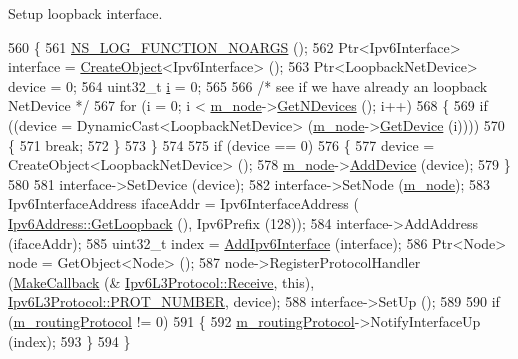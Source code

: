 Setup loopback interface. 


\begin{DoxyCode}
560 \{
561   \hyperlink{log-macros-disabled_8h_a8f7e4afc291c9d29a65c18ac1f79197b}{NS\_LOG\_FUNCTION\_NOARGS} ();
562   Ptr<Ipv6Interface> \textcolor{keyword}{interface }= \hyperlink{group__object_gad1d36559be10afa72c3656fd8598c1e2}{CreateObject}<Ipv6Interface> ();
563   Ptr<LoopbackNetDevice> device = 0;
564   uint32\_t \hyperlink{bernuolliDistribution_8m_a6f6ccfcf58b31cb6412107d9d5281426}{i} = 0;
565 
566   \textcolor{comment}{/* see if we have already an loopback NetDevice */}
567   \textcolor{keywordflow}{for} (i = 0; i < \hyperlink{classns3_1_1Ipv6L3Protocol_a543d8509395ee76de15d039ff1fce642}{m\_node}->\hyperlink{classns3_1_1Node_a531554d2241ba4fa1cd74e3360be6bce}{GetNDevices} (); i++)
568     \{
569       \textcolor{keywordflow}{if} ((device = DynamicCast<LoopbackNetDevice> (\hyperlink{classns3_1_1Ipv6L3Protocol_a543d8509395ee76de15d039ff1fce642}{m\_node}->\hyperlink{classns3_1_1Node_a5918dfd24ef632efc9a83a5f6561c76e}{GetDevice} (i))))
570         \{
571           \textcolor{keywordflow}{break};
572         \}
573     \}
574 
575   \textcolor{keywordflow}{if} (device == 0)
576     \{
577       device = CreateObject<LoopbackNetDevice> ();
578       \hyperlink{classns3_1_1Ipv6L3Protocol_a543d8509395ee76de15d039ff1fce642}{m\_node}->\hyperlink{classns3_1_1Node_a42ff83ee1d5d1649c770d3f5b62375de}{AddDevice} (device);
579     \}
580 
581   interface->SetDevice (device);
582   interface->SetNode (\hyperlink{classns3_1_1Ipv6L3Protocol_a543d8509395ee76de15d039ff1fce642}{m\_node});
583   Ipv6InterfaceAddress ifaceAddr = Ipv6InterfaceAddress (
      \hyperlink{classns3_1_1Ipv6Address_af62754355f28fadc671584dd02cd79b7}{Ipv6Address::GetLoopback} (), Ipv6Prefix (128));
584   interface->AddAddress (ifaceAddr);
585   uint32\_t index = \hyperlink{classns3_1_1Ipv6L3Protocol_aa0c786fd0209504c82b7278297a62f99}{AddIpv6Interface} (interface);
586   Ptr<Node> node = GetObject<Node> ();
587   node->RegisterProtocolHandler (\hyperlink{group__makecallbackmemptr_ga9376283685aa99d204048d6a4b7610a4}{MakeCallback} (&
      \hyperlink{classns3_1_1Ipv6L3Protocol_a8a95d576e8aee9a571db93bf686d850a}{Ipv6L3Protocol::Receive}, \textcolor{keyword}{this}), 
      \hyperlink{classns3_1_1Ipv6L3Protocol_ac44af6866e3ddd3f0cb9fbe228afdfe9}{Ipv6L3Protocol::PROT\_NUMBER}, device);
588   interface->SetUp ();
589 
590   \textcolor{keywordflow}{if} (\hyperlink{classns3_1_1Ipv6L3Protocol_aa0df547e5240b218dc1f4742a2a00117}{m\_routingProtocol} != 0)
591     \{
592       \hyperlink{classns3_1_1Ipv6L3Protocol_aa0df547e5240b218dc1f4742a2a00117}{m\_routingProtocol}->NotifyInterfaceUp (index);
593     \}
594 \}
\end{DoxyCode}


